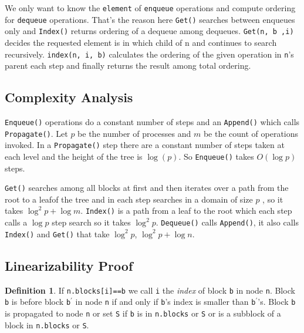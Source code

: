 \documentclass[10pt]{article}
\theoremstyle{definition}
\newtheorem{definition}[theorem]{Definition}
\begin{document}
We only want to know the \texttt{element} of \texttt{enqueue} operations and compute ordering for \texttt{dequeue} operations. That's the reason here \texttt{Get()} searches between enqueues only and \texttt{Index()} returns ordering of a dequeue among dequeues. \texttt{Get(n, b ,i)} decides the requested element is in which child of n and continues to search recursively. \texttt{index(n, i, b)} calculates the ordering of the given operation in \texttt{n}'s parent each step and finally returns the result among total ordering.

\subsection{Complexity Analysis}

\texttt{Enqueue()} operations do a constant number of steps and an \texttt{Append()} which calls \texttt{Propagate()}. Let $p$ be the number of processes and $m$ be the count of operations invoked. In a \texttt{Propagate()} step there are a constant number of steps taken at each level and the height of the tree is $\log(p)$. So \texttt{Enqueue()} takes $O(\log p)$ steps.

\texttt{Get()} searches among all blocks at first and then iterates over a path from the root to a leafof the tree and in each step searches in a domain of size $p$ , so it takes $\log^2 p+\log m$. \texttt{Index()} is a path from a leaf to the root which each step calls a $\log p$ step search so it takes $\log^2p$. \texttt{Dequeue()} calls \texttt{Append()}, it also calls \texttt{Index()} and \texttt{Get()} that take $\log^2 p$, $\log^2p +\log n$. 

\subsection{Linearizability Proof}

\begin{definition}
If \texttt{n.blocks[i]==b}  we call \texttt{i} the \emph{index} of block \texttt{b} in node \texttt{n}. Block \texttt{b} is before block \texttt{b$^\prime$} in node \texttt{n} if and only if \texttt{b}'s index is smaller than \texttt{b$^\prime$}'s. Block \texttt{b} is propagated to node \texttt{n} or set \texttt{S} if \texttt{b} is in \texttt{n.blocks} or \texttt{S} or is a subblock of a block in \texttt{n.blocks} or \texttt{S}.
\end{definition}

\end{document}
